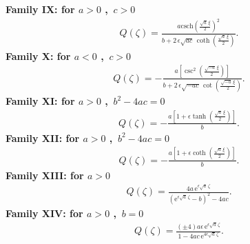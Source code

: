 \documentclass{article}
\numberwithin{equation}{section}
\begin{document}
\textbf{Family IX: for $a > 0$ , \,$c > 0$   }
\begin{eqnarray}\label{F9}
Q \! \left(\zeta \right) =\frac{a \mathrm{csch}\! \left(\frac{\sqrt{a}\, \xi}{2}\right)^{2}}{b +2\,\epsilon  \sqrt{a c}\, \coth \! \left(\frac{\sqrt{a}\, \xi}{2}\right)}.
\end{eqnarray}
\textbf{Family X: for $a < 0$ , \,$c > 0$ }
\begin{eqnarray}\label{F10}
Q \! \left(\zeta \right) =-\frac{a \left[\csc^{2}\left(\frac{\sqrt{-a}\, \xi}{2}\right)\right]}{b +2\,\epsilon  \sqrt{-a c}\, \cot \! \left(\frac{\sqrt{-a}\, \xi}{2}\right)}.
\end{eqnarray}
\textbf{Family XI: for $a > 0$ , \,$b^{2}-4ac = 0$  }
\begin{eqnarray}\label{F11}
Q \! \left(\zeta \right) =-\frac{a \left[1+\epsilon  \tanh \! \left(\frac{\sqrt{a}\, \xi}{2}\right)\right]}{b}.
\end{eqnarray}
\textbf{Family XII: for  $a > 0$ , \,$b^{2}-4ac = 0$ }
\begin{eqnarray}\label{F12}
Q \! \left(\zeta \right) =-\frac{a \left[1+\epsilon  \coth \! \left(\frac{\sqrt{a}\, \xi}{2}\right)\right]}{b}.
\end{eqnarray}
\textbf{Family XIII: for $a > 0$ }
\begin{eqnarray}\label{F13}
Q \! \left(\zeta \right) =\frac{4 a \,{\mathrm e}^{\epsilon  \sqrt{a}\, \zeta}}{\left({\mathrm e}^{\epsilon  \sqrt{a}\, \zeta}-b \right)^{2}-4 a c}.
\end{eqnarray}
\textbf{Family XIV:  for $a > 0$ ,\, $b = 0$  }
\begin{eqnarray}\label{F14}
Q \! \left(\zeta \right) =\frac{\left(\pm 4\right) a \epsilon  \,{\mathrm e}^{\epsilon  \sqrt{a}\, \zeta}}{1-4 a c \,{\mathrm e}^{4 \epsilon  \sqrt{a}\, \zeta}}.
\end{eqnarray}
\end{document}
